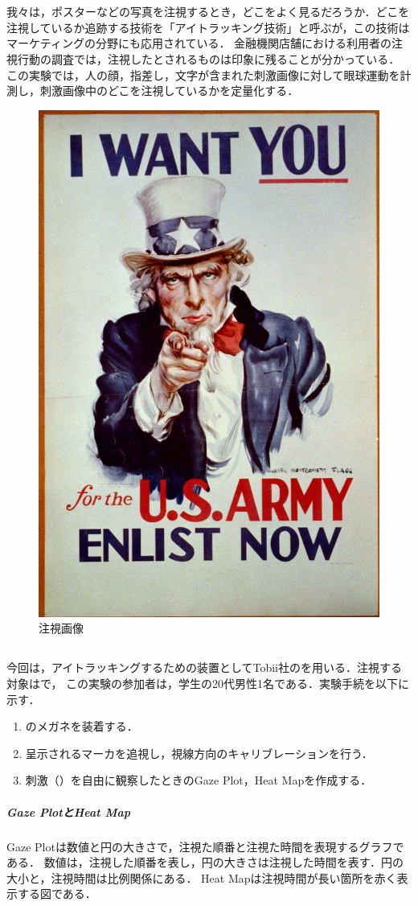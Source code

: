 \chapter{\kadaid}
\section{\purpose}
我々は，ポスターなどの写真を注視するとき，どこをよく見るだろうか．どこを注視しているか追跡する技術を「アイトラッキング技術」と呼ぶが，この技術はマーケティングの分野にも応用されている．
金融機関店舗における利用者の注視行動の調査\cite{アイトラッキング技術を用いた地域実践的研究の報告}では，注視したとされるものは印象に残ることが分かっている．
この実験では，人の顔，指差し，文字が含まれた刺激画像に対して眼球運動を計測し，刺激画像中のどこを注視しているかを定量化する．

\begin{figure}
    \centering
    \includegraphics[keepaspectratio,width=.15\textwidth]{../../12_DataAnalysis/snapshot.jpg}
    \caption{注視画像}
    \label{fig:注視画像}
    \vspace{-1.5cm}
\end{figure}
\section{\method}
今回は，アイトラッキングするための装置としてTobii社の\tobi を用いる．注視する対象はで，
この実験の参加者は，学生の20代男性1名である．実験手続を以下に示す．
\begin{enumerate}
    \renewcommand{\labelenumi}{\fbox{\theenumi}}
    \item \tobi のメガネを装着する．
    \item 呈示されるマーカを追視し，視線方向のキャリブレーションを行う．
    \item 刺激（）を自由に観察したときのGaze Plot，Heat Mapを作成する．
\end{enumerate}
\paragraph{Gaze PlotとHeat Map}
Gaze Plotは数値と円の大きさで，注視た順番と注視た時間を表現するグラフである．
数値は，注視した順番を表し，円の大きさは注視した時間を表す．円の大小と，注視時間は比例関係にある．
Heat Mapは注視時間が長い箇所を赤く表示する図である．

